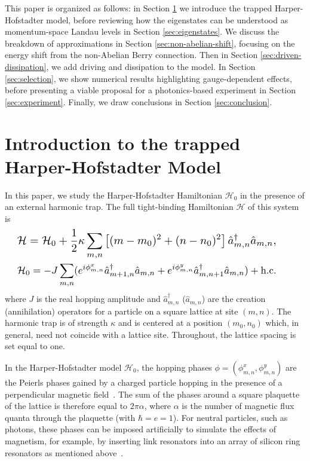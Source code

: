 \documentclass[twocolumn, 10pt, aps, superscriptaddress, floatfix, showpacs, pra, citeautoscript]{revtex4-1}
\begin{document}
This paper is organized as follows: in Section \ref{sec:model} we introduce the trapped Harper-Hofstadter model, before reviewing how the eigenstates can be understood as momentum-space Landau levels in Section \ref{sec:eigenstates}. We discuss the breakdown of approximations in Section \ref{sec:non-abelian-shift}, focusing on the energy shift from the non-Abelian Berry connection. Then in Section \ref{sec:driven-dissipation}, we add driving and dissipation to the model. In Section \ref{sec:selection}, we show numerical results highlighting gauge-dependent effects, before presenting a viable proposal for a
photonics-based experiment in Section \ref{sec:experiment}. Finally, we draw conclusions in Section \ref{sec:conclusion}. 


\section{Introduction to the trapped Harper-Hofstadter Model}
\label{sec:model}

In this paper, we study the Harper-Hofstadter Hamiltonian $\mathcal{H}_0$ in the presence of an external harmonic trap. The full tight-binding Hamiltonian $\mathcal{H}$ of this system is
%
\begin{eqnarray}
{\resizebox{.9\hsize}{!}{$\displaystyle{\mathcal{H}=\mathcal{H}_0+\frac{1}{2}\kappa
\sum_{m,n}\left[(m-m_0)^{2}+(n-n_0)^{2}\right]\hat{a}_{m,n}^{\dagger}\hat{a}_{m,n},}$}}  \qquad \label{eq:model}\\
{\resizebox{.9\hsize}{!}{$\displaystyle{\mathcal{H}_0=-J\sum_{m,n}(e^{i \phi_{m,n}^x}\hat{a}_{m+1,n}^{\dagger}\hat{a}_{m,n} 
+e^{i \phi_{m,n}^y}\hat{a}_{m,n+1}^{\dagger}\hat{a}_{m,n}) + \text{h.c.} }$}} \qquad\label{eq:hh_hamiltonian}
\end{eqnarray}
%
where $J$ is the real hopping amplitude and $\hat{a}_{m,n}^{\dagger}$ ($\hat{a}_{m,n}$) are the creation (annihilation) operators for a particle on a square lattice at site $(m,n)$. The harmonic trap is of strength $\kappa$ and is centered at a position $(m_0, n_0)$ which, in general, need not coincide with a lattice site. Throughout, the lattice spacing is set equal to one. 

In the Harper-Hofstadter model $\mathcal{H}_0$, the hopping phases $\phi = (\phi_{m,n}^x, \phi_{m,n}^y)$ are the Peierls phases gained by a charged particle hopping in the presence of a perpendicular magnetic field~\cite{harper1955magnetic,hofstadter1976butterfly}. The sum of the phases around a square plaquette of the lattice is therefore equal to $2\pi\alpha$, where $\alpha$ is the number of magnetic flux quanta through the plaquette (with $\hbar=e=1$). For neutral particles, such as photons, these phases can be imposed artificially to simulate the effects of magnetism, for example, by inserting link resonators into an array of silicon ring resonators as mentioned above~\cite{hafezi2013imaging}. 
\end{document}
